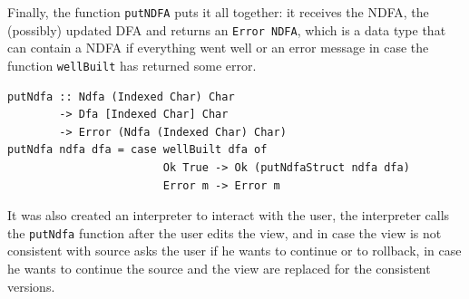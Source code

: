 Finally, the function \texttt{putNDFA} puts it all together: it receives the NDFA, the (possibly) updated DFA and returns an \texttt{Error NDFA}, which is a data type that can contain a NDFA if everything went well or an error message in case the function \texttt{wellBuilt} has returned some error. 

\begin{verbatim}
putNdfa :: Ndfa (Indexed Char) Char 
        -> Dfa [Indexed Char] Char
        -> Error (Ndfa (Indexed Char) Char)
putNdfa ndfa dfa = case wellBuilt dfa of 
                        Ok True -> Ok (putNdfaStruct ndfa dfa)
                        Error m -> Error m
\end{verbatim}

It was also created an interpreter to interact with the user, the interpreter calls the \texttt{putNdfa} function after the user edits the view, and in case the view is not consistent with source asks the user if he wants to continue or to rollback, in case he wants to continue the source and the view are replaced for the consistent versions.